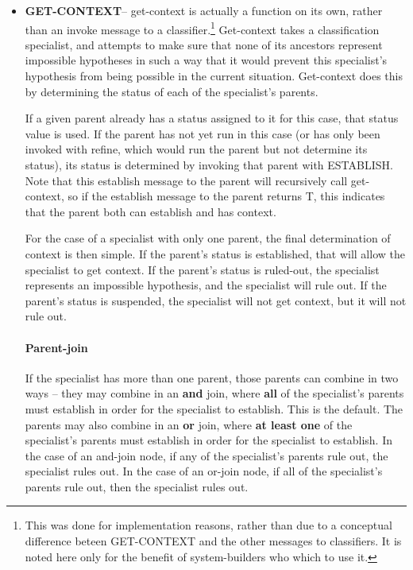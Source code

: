 \begin{itemize}
\item {\bf GET-CONTEXT}-- get-context is actually a function on its
own, rather than an invoke message to a classifier.\footnote{This was
done for implementation reasons, rather than due to a conceptual
difference beteen GET-CONTEXT and the other messages to classifiers.
It is noted here only for the benefit of system-builders who which to
use it.} Get-context takes a classification specialist, and attempts
to make sure that none of its ancestors represent impossible
hypotheses in such a way that it would prevent this specialist's
hypothesis from being possible in the current situation. Get-context
does this by determining the status of each of the specialist's
parents. 

If a given parent already has a status assigned to it for
this case, that status value is used. If the parent has not yet run in
this case (or has only been invoked with refine, which would run the
parent but not determine its status), its status is determined by
invoking that parent with ESTABLISH. Note that this establish message
to the parent will recursively call get-context, so if the establish
message to the parent returns T, this indicates that the parent both
can establish and has context. 

For the case of a specialist with only one parent, the final
determination of context is then simple.  If the parent's status is
established, that will allow the specialist to get
context. If the parent's status is ruled-out, the specialist
represents an impossible hypothesis, and the specialist will rule out.
If the parent's status is suspended, the specialist will not get
context, but it will not rule out.

\paragraph{Parent-join}

If the specialist has more than one parent, those parents can combine
in two ways -- they may combine in an {\bf and} join, where {\bf all}
of the specialist's parents must establish in order for the specialist
to establish. This is the default. The parents may also combine in an
{\bf or} join, where {\bf at least one} of the specialist's parents
must establish in order for the specialist to establish. In the case of
an and-join node, if any of the specialist's parents rule out, the specialist
rules out. In the case of an or-join node, if all of the specialist's
parents rule out, then the specialist rules out.



\end{itemize}
